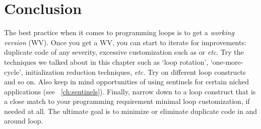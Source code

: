 \section{Conclusion}

The best practice when it comes to programming loops is to get a \emph{working version} (WV).
Once you get a WV, you can start to iterate for improvements:
duplicate code of any severity, excessive customization such as  or 
\textit{etc}.
Try the techniques we talked about in this chapter such as `loop rotation',
`one-more-cycle', initialization reduction techniques, \textit{etc.}
Try on different loop constructs and so on.
Also keep in mind opportunities of using sentinels for certain niched applications (see
~\autoref{ch:sentinels}).
Finally, narrow down to a loop construct
that is a close match to your programming requirement
minimal loop customization, if needed at all.
The ultimate goal is to minimize or eliminate duplicate code in and around loop.

%
%
